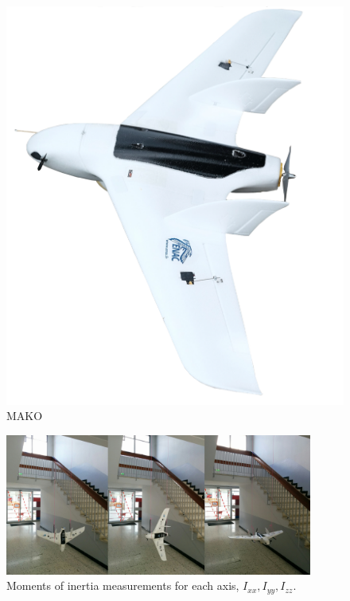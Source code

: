 \begin{figure}
\centering
\includegraphics[width=0.7\columnwidth]{figures/makoEmptyBack}
\caption{MAKO}
\label{figure:mako}
\end{figure}

 \begin{figure}
      \centering
      \includegraphics[width=0.9\textwidth]{figures/Mako_Inertia_combined_small.png}
      \caption{Moments of inertia measurements for each axis, $I_{xx} , I_{yy} , I_{zz} $.}
      \label{fig:inertia}
 \end{figure}
 
